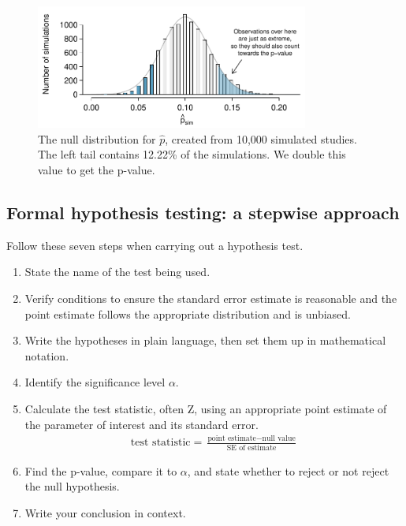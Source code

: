\begin{figure}[ht]
\centering
\includegraphics[width=0.8\textwidth]{ch_inference_foundations/figures/MedicalConsultant/MedConsNullSim}
\caption{The null distribution for $\hat{p}$, created from 10,000 simulated studies. The left tail contains 12.22\% of the simulations. We double this value to get the p-value.}
\label{MedConsNullSim}
\end{figure}

\subsection{Formal hypothesis testing: a stepwise approach\vspace{-3mm}}


\begin{termBox}{
Follow these seven steps when carrying out a hypothesis test. 
\begin{enumerate}
\setlength{\itemsep}{0mm}
\item State the name of the test being used.
\item Verify conditions to ensure the standard error estimate is reasonable and the point estimate follows the appropriate distribution and is unbiased.
\item Write the hypotheses in plain language, then set them up in mathematical notation.
\item Identify the significance level $\alpha$.
\item Calculate the test statistic, often Z, using an appropriate point estimate of the parameter of interest and its standard error.\vspace{-1.5mm}
\begin{align*}
\text{test statistic} = \frac{\text{point estimate} - \text{null value}}{\text{SE of estimate}}
\end{align*}
\item Find the p-value, compare it to $\alpha$, and state whether to reject or not reject the null hypothesis.
\item Write your conclusion in context.
\end{enumerate}}
\end{termBox}

